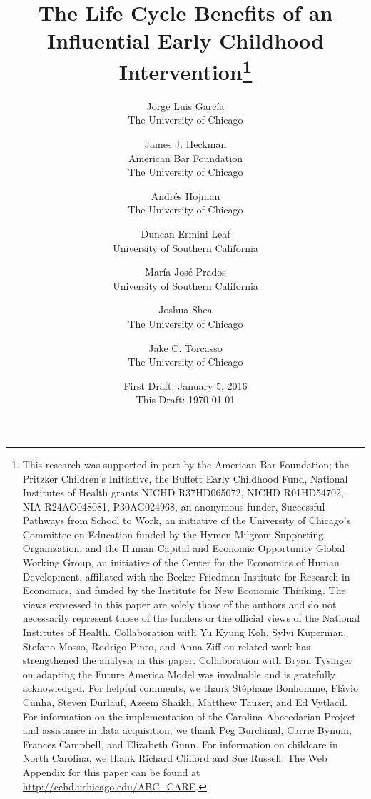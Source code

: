 






\begin{titlepage}

\title{\Large \textbf{The Life Cycle Benefits of an Influential Early Childhood Intervention}\thanks{This research was supported in part by the American Bar Foundation; the Pritzker Children's Initiative, the Buffett Early Childhood Fund, National Institutes of Health grants NICHD R37HD065072, NICHD R01HD54702, NIA R24AG048081, P30AG024968, an anonymous funder, Successful Pathways from School to Work, an initiative of the University of Chicago's Committee on Education funded by the Hymen Milgrom Supporting Organization, and the Human Capital and Economic Opportunity Global Working Group, an initiative of the Center for the Economics of Human Development, affiliated with the Becker Friedman Institute for Research in Economics, and funded by the Institute for New Economic Thinking. The views expressed in this paper are solely those of the authors and do not necessarily represent those of the funders or the official views of the National Institutes of Health. Collaboration with Yu Kyung Koh, Sylvi Kuperman, Stefano Mosso, Rodrigo Pinto, and Anna Ziff on related work has strengthened the analysis in this paper. Collaboration with Bryan Tysinger on adapting the Future America Model was invaluable and is gratefully acknowledged. For helpful comments, we thank St\'{e}phane Bonhomme, Fl\'{a}vio Cunha, Steven Durlauf, Azeem Shaikh, Matthew Tauzer, and Ed Vytlacil. For information on the implementation of the Carolina Abecedarian Project and assistance in data acquisition, we thank Peg Burchinal, Carrie Bynum, Frances Campbell, and Elizabeth Gunn. For information on childcare in North Carolina, we thank Richard Clifford and Sue Russell. The Web Appendix for this paper can be found at \url{http://cehd.uchicago.edu/ABC_CARE}.}}

\author{
Jorge Luis Garc\'{i}a\\
The University of Chicago \and
James J. Heckman \\
American Bar Foundation \\
The University of Chicago \and
Andr\'{e}s Hojman\\
The University of Chicago \and
Duncan Ermini Leaf \\
University of Southern California \and
Mar\'{i}a Jos\'{e} Prados \\
University of Southern California \and
Joshua Shea \\
The University of Chicago \and
Jake C. Torcasso\\
The University of Chicago}
\date{First Draft: January 5, 2016\\ This Draft: \today}

\maketitle

\end{titlepage}

